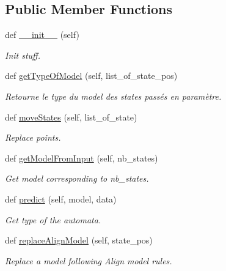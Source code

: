 \subsection*{Public Member Functions}
\begin{DoxyCompactItemize}
\item 
\mbox{\label{classmozia_1_1MOZIA_a7179df59dc73f6bb18b763f456a923a1}} 
def \mbox{\hyperlink{classmozia_1_1MOZIA_a7179df59dc73f6bb18b763f456a923a1}{\+\_\+\+\_\+init\+\_\+\+\_\+}} (self)
\begin{DoxyCompactList}\small\item\em Init stuff. \end{DoxyCompactList}\item 
def \mbox{\hyperlink{classmozia_1_1MOZIA_ae2319df142aaa0f183a8756b200ed2f8}{get\+Type\+Of\+Model}} (self, list\+\_\+of\+\_\+state\+\_\+pos)
\begin{DoxyCompactList}\small\item\em Retourne le type du model des states passés en paramètre. \end{DoxyCompactList}\item 
def \mbox{\hyperlink{classmozia_1_1MOZIA_a5e4d422fea8e9176715d5cd8e0cdfa80}{move\+States}} (self, list\+\_\+of\+\_\+state)
\begin{DoxyCompactList}\small\item\em Replace points. \end{DoxyCompactList}\item 
def \mbox{\hyperlink{classmozia_1_1MOZIA_a9e51a2d9116afe84cdafda9edca4960b}{get\+Model\+From\+Input}} (self, nb\+\_\+states)
\begin{DoxyCompactList}\small\item\em Get model corresponding to nb\+\_\+states. \end{DoxyCompactList}\item 
def \mbox{\hyperlink{classmozia_1_1MOZIA_a898fd2c5122142fafda0b85072b8111a}{predict}} (self, model, data)
\begin{DoxyCompactList}\small\item\em Get type of the automata. \end{DoxyCompactList}\item 
def \mbox{\hyperlink{classmozia_1_1MOZIA_abc882fa3ab57d2e757933881b3555244}{replace\+Align\+Model}} (self, state\+\_\+pos)
\begin{DoxyCompactList}\small\item\em Replace a model following Align model rules. \end{DoxyCompactList}\item 

\end{DoxyCompactItemize}
